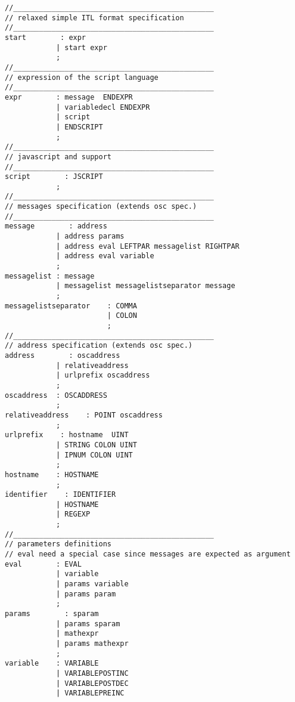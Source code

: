 \begin{verbatim}
//_______________________________________________
// relaxed simple ITL format specification
//_______________________________________________
start        : expr
            | start expr
            ;
//_______________________________________________
// expression of the script language
//_______________________________________________
expr        : message  ENDEXPR        
            | variabledecl ENDEXPR    
            | script            
            | ENDSCRIPT            
            ;
//_______________________________________________
// javascript and support
//_______________________________________________
script        : JSCRIPT            
            ;
//_______________________________________________
// messages specification (extends osc spec.)
//_______________________________________________
message        : address                    
            | address params            
            | address eval LEFTPAR messagelist RIGHTPAR
            | address eval variable        
            ;
messagelist : message                    
            | messagelist messagelistseparator message 
            ;
messagelistseparator    : COMMA
                        | COLON
                        ;
//_______________________________________________
// address specification (extends osc spec.)
address        : oscaddress                
            | relativeaddress            
            | urlprefix oscaddress        
            ;
oscaddress  : OSCADDRESS                
            ;
relativeaddress    : POINT oscaddress        
            ;
urlprefix    : hostname  UINT            
            | STRING COLON UINT            
            | IPNUM COLON UINT            
            ;
hostname    : HOSTNAME                    
            ;
identifier    : IDENTIFIER                
            | HOSTNAME                    
            | REGEXP                    
            ;
//_______________________________________________
// parameters definitions
// eval need a special case since messages are expected as argument
eval        : EVAL                
            | variable                
            | params variable        
            | params param            
            ;
params        : sparam                
            | params sparam            
            | mathexpr                
            | params mathexpr        
            ;
variable    : VARIABLE                
            | VARIABLEPOSTINC        
            | VARIABLEPOSTDEC        
            | VARIABLEPREINC        

\end{verbatim}
